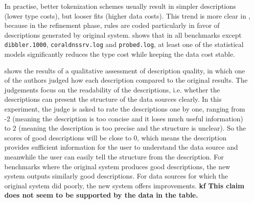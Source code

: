 In practise, better tokenization schemes usually result in simpler
descriptions (lower type costs), but looser fits (higher data
costs). This trend is more clear in , because
in the refinement phase, rules are coded particularly in favor of
descriptions generated by original \learnpads{} system.  shows that in all benchmarks except
{\tt dibbler.1000}, {\tt coraldnssrv.log} and {\tt probed.log}, at
least one of the statistical models significantly reduces the type
cost while keeping the data cost stable.

 shows the results of a qualitative assessment of
description quality, in which one of the authors judged how each
description compared to the original \learnpads{} results. The
judgements focus on the readability of the descriptions, i.e.
whether the descriptions can present the structure of the data
sources clearly. In this experiment, the judge is asked to rate the
descriptions one by one, ranging from -2 (meaning the description is
too concise and it loses much useful information) to 2 (meaning the
description is too precise and the structure is unclear). So the
scores of good descriptions will be close to 0, which means the
description provides sufficient information for the user to
understand the data source and meanwhile the user can easily tell
the structure from the description.
For benchmarks where the original system produces good descriptions,
the new system outputs similarly good descriptions. For
data sources for which the original system did poorly,
the new system offers improvements.
{\bf kf This claim does not seem to be supported by the data in the
  table. }

